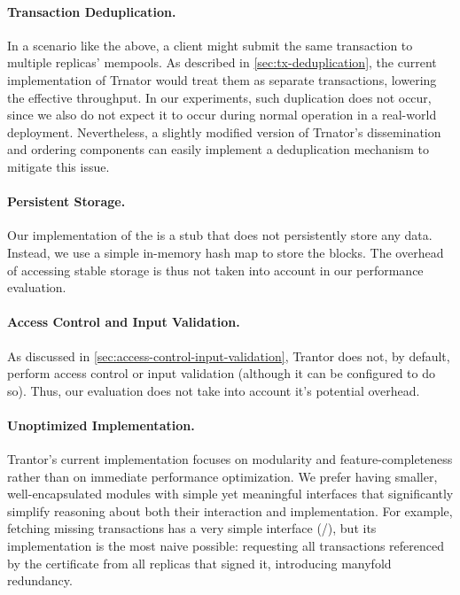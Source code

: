 \documentclass{article}
\begin{document}
\paragraph{Transaction Deduplication.}
In a scenario like the above, a client might submit the same transaction to multiple replicas' mempools.
As described in \cref{sec:tx-deduplication}, the current implementation of Trnator would treat them as separate transactions,
lowering the effective throughput.
In our experiments, such duplication does not occur, since we also do not expect it to occur during normal operation in a real-world deployment.
Nevertheless, a slightly modified version of Trnator's dissemination and ordering components
can easily implement a deduplication mechanism \cite{mirbft,iss} to mitigate this issue.

\paragraph{Persistent Storage.}
Our implementation of the  is a stub that does not persistently store any data.
Instead, we use a simple in-memory hash map to store the blocks.
The overhead of accessing stable storage is thus not taken into account in our performance evaluation.

\paragraph{Access Control and Input Validation.}
As discussed in \cref{sec:access-control-input-validation}, Trantor does not, by default, perform access control or input validation
(although it can be configured to do so).
Thus, our evaluation does not take into account it's potential overhead.

\paragraph{Unoptimized Implementation.}
Trantor's current implementation focuses on modularity and feature-completeness rather than on immediate performance optimization.
We prefer having smaller, well-encapsulated modules with simple yet meaningful interfaces
that significantly simplify reasoning about both their interaction and implementation.
For example, fetching missing transactions has a very simple interface (/),
but its implementation is the most naive possible: requesting all transactions referenced by the certificate from all replicas that signed it,
introducing manyfold redundancy.
\end{document}
